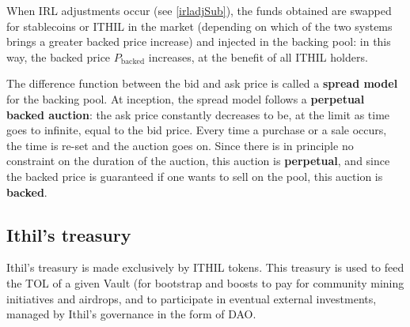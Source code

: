 \documentclass[a4paper,10 pt]{article}
\theoremstyle{definition}
\begin{document}
When IRL adjustments occur (see \ref{irladjSub}), the funds obtained are swapped for stablecoins or ITHIL in the market (depending on which of the two systems brings a greater backed price increase) and injected in the backing pool: in this way, the backed price $P_{\text{backed}}$ increases, at the benefit of all ITHIL holders.

The difference function between the bid and ask price is called a {\bf spread model} for the backing pool. At inception, the spread model follows a {\bf perpetual backed auction}: the ask price constantly decreases to be, at the limit as time goes to infinite, equal to the bid price. Every time a purchase or a sale occurs, the time is re-set and the auction goes on. Since there is in principle no constraint on the duration of the auction, this auction is {\bf perpetual}, and since the backed price is guaranteed if one wants to sell on the pool, this auction is {\bf backed}.

\subsection{Ithil's treasury}\label{ItSub}
Ithil's treasury is made exclusively by ITHIL tokens. This treasury is used to feed the TOL of a given Vault (for bootstrap and boosts to pay for community mining initiatives and airdrops, and to participate in eventual external investments, managed by Ithil's governance in the form of DAO.
\end{document}
